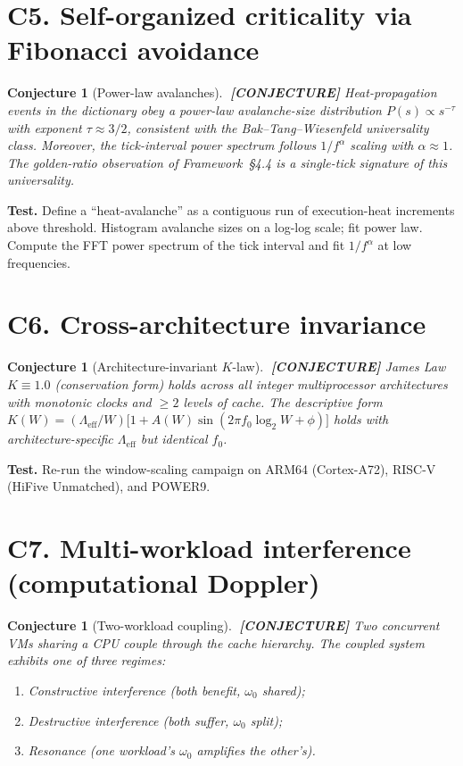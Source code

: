 \documentclass[11pt,letterpaper,openany]{book}
\theoremstyle{definition}
\theoremstyle{plain}
\newtheorem{openconjecture}[definition]{Conjecture}
\newcommand{\conjecture}{\textcolor{red!60!black}{\textbf{[CONJECTURE]}}\xspace}
\newcommand{\Lambdaeff}{\Lambda_{\mathrm{eff}}}
\begin{document}
\section*{C5. Self-organized criticality via Fibonacci avoidance}

\begin{openconjecture}[Power-law avalanches]\label{conj:soc}
$\;$\conjecture
Heat-propagation events in the dictionary obey a power-law avalanche-size
distribution $P(s) \propto s^{-\tau}$ with exponent $\tau \approx 3/2$,
consistent with the Bak--Tang--Wiesenfeld universality class. Moreover,
the tick-interval power spectrum follows $1/f^\alpha$ scaling with
$\alpha \approx 1$. The golden-ratio observation of Framework~\S4.4 is a
single-tick signature of this universality.
\end{openconjecture}

\noindent\textbf{Test.} Define a ``heat-avalanche'' as a contiguous run
of execution-heat increments above threshold. Histogram avalanche sizes
on a log-log scale; fit power law. Compute the FFT power spectrum of the
tick interval and fit $1/f^\alpha$ at low frequencies.

\section*{C6. Cross-architecture invariance}

\begin{openconjecture}[Architecture-invariant $K$-law]\label{conj:cross-arch}
$\;$\conjecture
James Law $K \equiv 1.0$ (conservation form) holds across all integer
multiprocessor architectures with monotonic clocks and $\ge 2$ levels of
cache. The descriptive form $K(W) = (\Lambdaeff/W)\bigl[1 + A(W)\sin(2\pi f_0\log_2 W+\phi)\bigr]$
holds with architecture-specific $\Lambdaeff$ but identical $f_0$.
\end{openconjecture}

\noindent\textbf{Test.} Re-run the window-scaling campaign on
ARM64 (Cortex-A72), RISC-V (HiFive Unmatched), and POWER9.

\section*{C7. Multi-workload interference (computational Doppler)}

\begin{openconjecture}[Two-workload coupling]\label{conj:doppler}
$\;$\conjecture
Two concurrent VMs sharing a CPU couple through the cache hierarchy.
The coupled system exhibits one of three regimes:
\begin{enumerate}\setlength\itemsep{0pt}
  \item Constructive interference (both benefit, $\omega_0$ shared);
  \item Destructive interference (both suffer, $\omega_0$ split);
  \item Resonance (one workload's $\omega_0$ amplifies the other's).
\end{enumerate}
\end{openconjecture}
\end{document}
